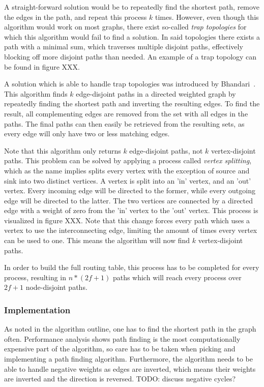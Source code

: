 A straight-forward solution would be to repeatedly find the shortest path, remove the edges in the path, and repeat this process $k$ times. However, even though this algorithm would work on most graphs, there exist so-called \textit{trap topologies} for which this algorithm would fail to find a solution. In said topologies there exists a path with a minimal sum, which traverses multiple disjoint paths, effectively blocking off more disjoint paths than needed. An example of a trap topology can be found in figure XXX.

A solution which is able to handle trap topologies was introduced by Bhandari~\citationneeded. This algorithm finds $k$ edge-disjoint paths in a directed weighted graph by repeatedly finding the shortest path and inverting the resulting edges. To find the result, all complementing edges are removed from the set with all edges in the paths. The final paths can then easily be retrieved from the resulting sets, as every edge will only have two or less matching edges.

Note that this algorithm only returns $k$ edge-disjoint paths, not $k$ vertex-disjoint paths. This problem can be solved by applying a process called \textit{vertex splitting}, which as the name implies splits every vertex with the exception of source and sink into two distinct vertices. 
A vertex is split into an 'in' vertex, and an 'out' vertex. Every incoming edge will be directed to the former, while every outgoing edge will be directed to the latter. The two vertices are connected by a directed edge with a weight of zero from the 'in' vertex to the 'out' vertex. This process is visualized in figure XXX. Note that this change forces every path which uses a vertex to use the interconnecting edge, limiting the amount of times every vertex can be used to one. This means the algorithm will now find $k$ vertex-disjoint paths.

In order to build the full routing table, this process has to be completed for every process, resulting in $n * (2f+1)$ paths which will reach every process over $2f+1$ node-disjoint paths.

\subsubsection{Implementation}
As noted in the algorithm outline, one has to find the shortest path in the graph often. Performance analysis shows path finding is the most computationally expensive part of the algorithm, so care has to be taken when picking and implementing a path finding algorithm. Furthermore, the algorithm needs to be able to handle negative weights as edges are inverted, which means their weights are inverted and the direction is reversed. TODO: discuss negative cycles?

